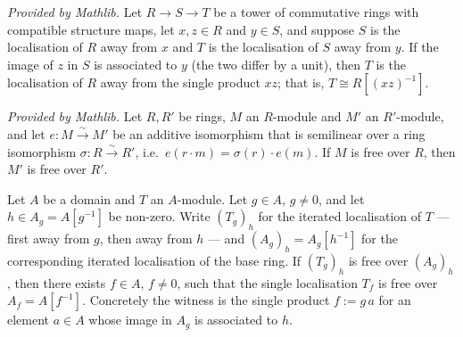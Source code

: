 \begin{lemma}
  \label{lem:isLocalization_away_mul_of_associated}
  \mathlibok
  \textit{Provided by Mathlib.}
  Let \(R \to S \to T\) be a tower of commutative rings with compatible structure maps, let
  \(x, z \in R\) and \(y \in S\), and suppose \(S\) is the localisation of \(R\) away from
  \(x\) and \(T\) is the localisation of \(S\) away from \(y\). If the image of \(z\) in \(S\)
  is associated to \(y\) (the two differ by a unit), then \(T\) is the localisation of \(R\)
  away from the single product \(x z\); that is, \(T \cong R[(x z)^{-1}]\).
\end{lemma}

\begin{lemma}
  \label{lem:module_free_of_ringEquiv}
  \mathlibok
  \textit{Provided by Mathlib.}
  Let \(R, R'\) be rings, \(M\) an \(R\)-module and \(M'\) an \(R'\)-module, and let
  \(e : M \xrightarrow{\sim} M'\) be an additive isomorphism that is semilinear over a ring
  isomorphism \(\sigma : R \xrightarrow{\sim} R'\), i.e.\ \(e(r \cdot m) = \sigma(r) \cdot e(m)\).
  If \(M\) is free over \(R\), then \(M'\) is free over \(R'\).
\end{lemma}

\begin{lemma}
  \label{lem:gf_away_tower_descent}
  Let \(A\) be a domain and \(T\) an \(A\)-module. Let \(g \in A\), \(g \ne 0\), and let
  \(h \in A_g = A[g^{-1}]\) be non-zero. Write
  \((T_g)_h\) for the iterated localisation of \(T\) — first away from \(g\), then away from
  \(h\) — and \((A_g)_h = A_g[h^{-1}]\) for the corresponding iterated localisation of the
  base ring. If \((T_g)_h\) is free over \((A_g)_h\), then there exists \(f \in A\),
  \(f \ne 0\), such that the single localisation \(T_f\) is free over \(A_f = A[f^{-1}]\).
  Concretely the witness is the single product \(f := g\,a\) for an element \(a \in A\) whose
  image in \(A_g\) is associated to \(h\).
\end{lemma}

